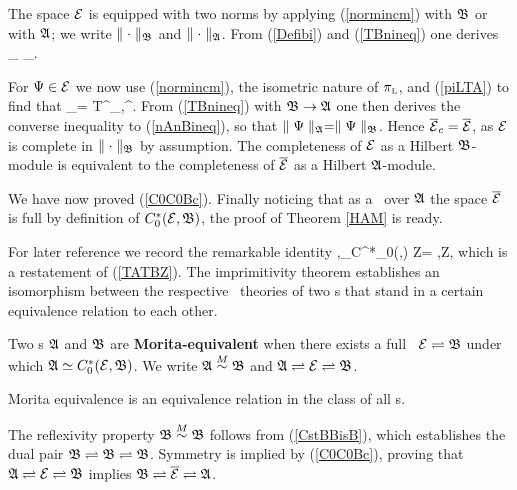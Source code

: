 The space ${\cal E}$ is equipped with two norms by applying
(\ref{normincm}) with ${\frak B}$ or with ${\frak A}$; we write $\parallel\cdot\parallel_{{\frak B}}$ and
$\parallel\cdot\parallel_{{\frak A}}$.  From (\ref{Defibi}) and (\ref{TBnineq}) one derives
\be \n\Ps\n_{\A}\,\leq\,\n \Ps\n_{\B}.  \ee

For $\Psi\in{\cal E}$ we now use (\ref{normincm}), the isometric nature of
$\pi_{\mbox{\tiny L}}$, and (\ref{piLTA}) to find that 
\be
\n\Ps\n_{\B}= \n T^{\A}_{\Ps,\Ps}\n^{\half}.
\ee 
 From (\ref{TBnineq}) with ${\frak B}\rightarrow{\frak A}$ one
then derives the converse inequality to (\ref{nAnBineq}), so that
$\parallel\Psi\parallel_{{\frak A}}=\parallel \Psi\parallel_{{\frak B}}$.  Hence $\overline{{\cal E}}_c=\overline{{\cal E}}$, as ${\cal E}$
is complete in $\parallel\cdot\parallel_{{\frak B}}$ by assumption.  The completeness of
${\cal E}$ as a Hilbert ${\frak B}$-module is equivalent to the completeness of
$\overline{{\cal E}}$ as a Hilbert ${\frak A}$-module.

We have now proved (\ref{C0C0Bc}). Finally noticing that as a \HCM\
over ${\frak A}$ the space $\overline{{\cal E}}$ is full by definition of $
C_0^*({\cal E},{\frak B})$, the proof of Theorem \ref{HAM} is ready.  \enp

For later reference we record the remarkable identity \be
\la\Ps,\Ph\ra_{C^*_0(\CE,\B)} Z= \Ps\la\Ph,Z\bb,  \ee which
is a restatement of (\ref{TATBZ}).  \su{Morita equivalence\ll{qme}}
The imprimitivity theorem establishes an isomorphism between the
respective \rep\ theories of two \ca s that stand in a certain
equivalence relation to each other.
\begin{Definition}
Two \ca s ${\frak A}$ and ${\frak B}$ are {\bf
Morita-equivalent} when there exists a
full \HCM\ ${\cal E}\rightleftharpoons{\frak B}$ under which ${\frak A}\simeq C_0^*({\cal E},{\frak B})$. We
write ${\frak A}\stackrel{M}{\sim}{\frak B}$ and ${\frak A}\rightleftharpoons{\cal E}\rightleftharpoons{\frak B}$.\end{Definition}
\begin{Proposition}
Morita equivalence is an equivalence relation in the class of all \ca
s.
\end{Proposition}

The reflexivity property ${\frak B}\stackrel{M}{\sim}{\frak B}$ follows from (\ref{CstBBisB}),
which establishes the dual pair ${\frak B}\rightleftharpoons{\frak B}\rightleftharpoons{\frak B}$.  Symmetry is implied
by (\ref{C0C0Bc}), proving that ${\frak A}\rightleftharpoons{\cal E}\rightleftharpoons{\frak B}$ implies
${\frak B}\rightleftharpoons\overline{{\cal E}}\rightleftharpoons{\frak A}$.


